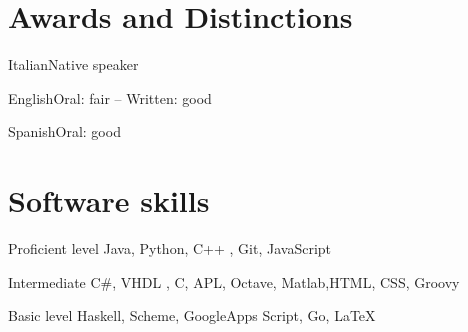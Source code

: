 \documentclass[fontsize=9pt]{tccv}
\begin{document}
\section{Awards and Distinctions}

\begin{factlist}
\item{Italian}{Native speaker}
\item{English}{Oral: fair -- Written: good}
\item{Spanish}{Oral: good}
\end{factlist}

\section{Software skills}

\begin{factlist}

\item{Proficient level}
     {Java, Python, C++ , Git, JavaScript}

\item{Intermediate}
     { C\#, VHDL , C, APL, Octave, Matlab,HTML, CSS, Groovy}

\item{Basic level}
     {Haskell, Scheme, GoogleApps Script,  Go, \LaTeX}

\end{factlist}
\end{document}
